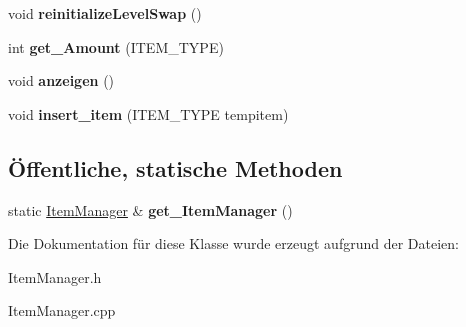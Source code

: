 \begin{DoxyCompactItemize}
\item 
\hypertarget{class_item_manager_a12de0abfc6c0fb4159cfd3d328c8156d}{void {\bfseries reinitialize\-Level\-Swap} ()}\label{class_item_manager_a12de0abfc6c0fb4159cfd3d328c8156d}

\item 
\hypertarget{class_item_manager_a0378129c02026441a55d1074be0cd9f8}{int {\bfseries get\-\_\-\-Amount} (I\-T\-E\-M\-\_\-\-T\-Y\-P\-E)}\label{class_item_manager_a0378129c02026441a55d1074be0cd9f8}

\item 
\hypertarget{class_item_manager_af72a2522a8ae7b2b7a01614e44a132a8}{void {\bfseries anzeigen} ()}\label{class_item_manager_af72a2522a8ae7b2b7a01614e44a132a8}

\item 
\hypertarget{class_item_manager_a4a49254cca50492af965ad5643ca9126}{void {\bfseries insert\-\_\-item} (I\-T\-E\-M\-\_\-\-T\-Y\-P\-E tempitem)}\label{class_item_manager_a4a49254cca50492af965ad5643ca9126}

\end{DoxyCompactItemize}
\subsection*{Öffentliche, statische Methoden}
\begin{DoxyCompactItemize}
\item 
\hypertarget{class_item_manager_a8ab85b998d783ff05a811445f6133173}{static \hyperlink{class_item_manager}{Item\-Manager} \& {\bfseries get\-\_\-\-Item\-Manager} ()}\label{class_item_manager_a8ab85b998d783ff05a811445f6133173}

\end{DoxyCompactItemize}


Die Dokumentation für diese Klasse wurde erzeugt aufgrund der Dateien\-:\begin{DoxyCompactItemize}
\item 
Item\-Manager.\-h\item 
Item\-Manager.\-cpp\end{DoxyCompactItemize}
